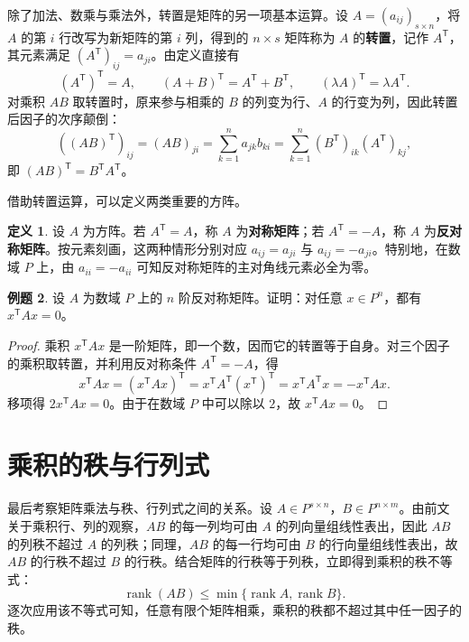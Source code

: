 \documentclass[UTF8,fontset=fandol,a4paper,12pt]{ctexart}
\newcommand{\rank}{\operatorname{rank}}
\newcommand{\trans}{\mathsf T}
\theoremstyle{definition}
\newtheorem{definition}{定义}[section]
\newtheorem{example}[definition]{例题}
\begin{document}
除了加法、数乘与乘法外，转置是矩阵的另一项基本运算。设 $A=(a_{ij})_{s\times n}$，将 $A$ 的第 $i$ 行改写为新矩阵的第 $i$ 列，得到的 $n\times s$ 矩阵称为 $A$ 的\textbf{转置}，记作 $A^{\trans}$，其元素满足 $(A^{\trans})_{ij}=a_{ji}$。由定义直接有
\[
 (A^{\trans})^{\trans}=A,\qquad
 (A+B)^{\trans}=A^{\trans}+B^{\trans},\qquad
 (\lambda A)^{\trans}=\lambda A^{\trans}.
\]
对乘积 $AB$ 取转置时，原来参与相乘的 $B$ 的列变为行、$A$ 的行变为列，因此转置后因子的次序颠倒：
\[
 ((AB)^{\trans})_{ij}=(AB)_{ji}=\sum_{k=1}^{n} a_{jk}b_{ki}
 =\sum_{k=1}^{n} (B^{\trans})_{ik}(A^{\trans})_{kj},
\]
即 $(AB)^{\trans}=B^{\trans}A^{\trans}$。

借助转置运算，可以定义两类重要的方阵。

\begin{definition}
设 $A$ 为方阵。若 $A^{\trans}=A$，称 $A$ 为\textbf{对称矩阵}；若 $A^{\trans}=-A$，称 $A$ 为\textbf{反对称矩阵}。按元素刻画，这两种情形分别对应 $a_{ij}=a_{ji}$ 与 $a_{ij}=-a_{ji}$。特别地，在数域 $P$ 上，由 $a_{ii}=-a_{ii}$ 可知反对称矩阵的主对角线元素必全为零。
\end{definition}

\begin{example}
设 $A$ 为数域 $P$ 上的 $n$ 阶反对称矩阵。证明：对任意 $x\in P^n$，都有 $x^{\trans}Ax=0$。
\end{example}
\begin{proof}
乘积 $x^{\trans}Ax$ 是一阶矩阵，即一个数，因而它的转置等于自身。对三个因子的乘积取转置，并利用反对称条件 $A^{\trans}=-A$，得
\[
 x^{\trans}Ax=(x^{\trans}Ax)^{\trans}
 =x^{\trans}A^{\trans}(x^{\trans})^{\trans}
 =x^{\trans}A^{\trans}x=-x^{\trans}Ax.
\]
移项得 $2x^{\trans}Ax=0$。由于在数域 $P$ 中可以除以 $2$，故 $x^{\trans}Ax=0$。
\end{proof}

\section{乘积的秩与行列式}

最后考察矩阵乘法与秩、行列式之间的关系。设 $A\in P^{s\times n}$，$B\in P^{n\times m}$。由前文关于乘积行、列的观察，$AB$ 的每一列均可由 $A$ 的列向量组线性表出，因此 $AB$ 的列秩不超过 $A$ 的列秩；同理，$AB$ 的每一行均可由 $B$ 的行向量组线性表出，故 $AB$ 的行秩不超过 $B$ 的行秩。结合矩阵的行秩等于列秩，立即得到乘积的秩不等式：
\[
 \boxed{\rank(AB)\le\min\{\rank A,\rank B\}.}
\]
逐次应用该不等式可知，任意有限个矩阵相乘，乘积的秩都不超过其中任一因子的秩。
\end{document}
